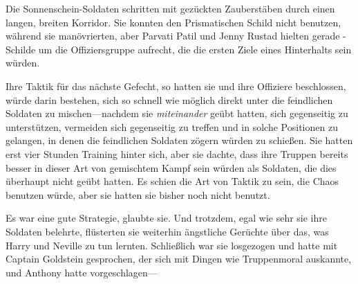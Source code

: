 \later

Die Sonnenschein-Soldaten schritten mit gezückten Zauberstäben durch einen langen, breiten Korridor. Sie konnten den Prismatischen Schild nicht benutzen, während sie manövrierten, aber Parvati Patil und Jenny Rustad hielten gerade -Schilde um die Offiziersgruppe aufrecht, die die ersten Ziele eines Hinterhalts sein würden.

Ihre Taktik für das nächste Gefecht, so hatten sie und ihre Offiziere beschlossen, würde darin bestehen, sich so schnell wie möglich direkt unter die feindlichen Soldaten zu mischen—nachdem sie \emph{miteinander} geübt hatten, sich gegenseitig zu unterstützen, vermeiden sich gegenseitig zu treffen und in solche Positionen zu gelangen, in denen die feindlichen Soldaten zögern würden zu schießen. Sie hatten erst vier Stunden Training hinter sich, aber sie dachte, dass ihre Truppen bereits besser in dieser Art von gemischtem Kampf sein würden als Soldaten, die dies überhaupt nicht geübt hatten. Es schien die Art von Taktik zu sein, die Chaos benutzen würde, aber sie hatten sie bisher noch nicht benutzt.

Es war eine gute Strategie, glaubte sie. Und trotzdem, egal wie sehr sie ihre Soldaten belehrte, flüsterten sie weiterhin ängstliche Gerüchte über das, was Harry und Neville zu tun lernten. Schließlich war sie losgezogen und hatte mit Captain Goldstein gesprochen, der sich mit Dingen wie Truppenmoral auskannte, und Anthony hatte vorgeschlagen—

